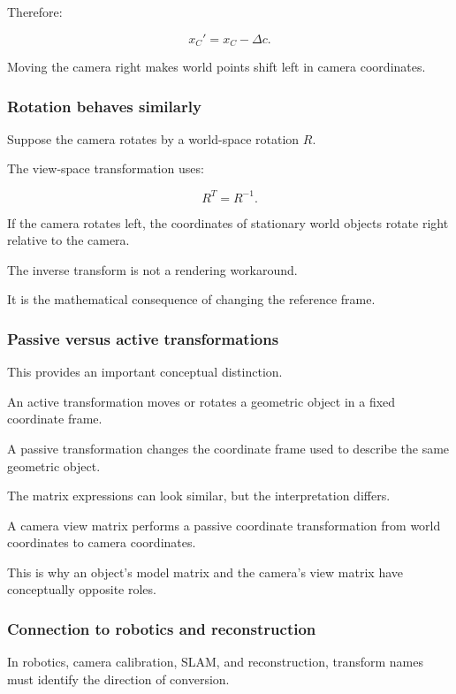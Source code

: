 Therefore:

\[
 \boxed{x_C'=x_C-\Delta c}.
\]

Moving the camera right makes world points shift left in camera coordinates.

\subsubsection{Rotation behaves similarly}\label{02-foundations-ii-ch032-rotation-behaves-similarly}

Suppose the camera rotates by a world-space rotation \(R\).

The view-space transformation uses:

\[
 R^T=R^{-1}.
\]

If the camera rotates left, the coordinates of stationary world objects rotate right relative to the camera.

The inverse transform is not a rendering workaround.

It is the mathematical consequence of changing the reference frame.

\subsubsection{Passive versus active transformations}\label{02-foundations-ii-ch032-passive-versus-active-transformations}

This provides an important conceptual distinction.

An active transformation moves or rotates a geometric object in a fixed coordinate frame.

A passive transformation changes the coordinate frame used to describe the same geometric object.

The matrix expressions can look similar, but the interpretation differs.

A camera view matrix performs a passive coordinate transformation from world coordinates to camera coordinates.

This is why an object's model matrix and the camera's view matrix have conceptually opposite roles.

\subsubsection{Connection to robotics and reconstruction}\label{02-foundations-ii-ch032-connection-to-robotics-and-reconstruction}

In robotics, camera calibration, SLAM, and reconstruction, transform names must identify the direction of conversion.

